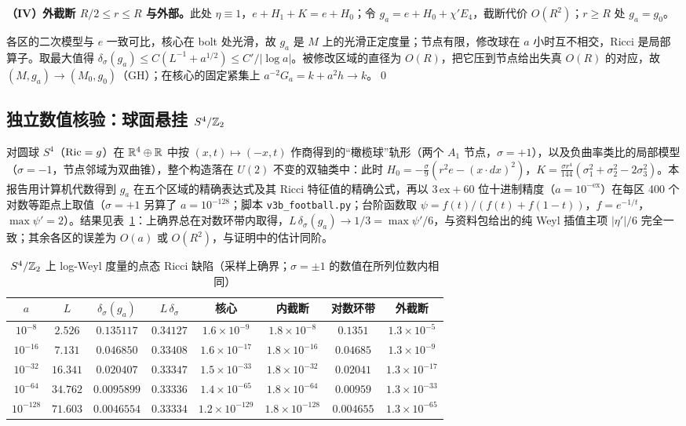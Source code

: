 \textbf{（IV）外截断 $R/2\le r\le R$ 与外部。}此处 $\eta\equiv1$，$e+H_1+K=e+H_0$；令 $g_a=e+H_0+\chi'E_4$，截断代价 $O(R^2)$；$r\ge R$ 处 $g_a=g_0$。

各区的二次模型与 $e$ 一致可比，核心在 bolt 处光滑，故 $g_a$ 是 $M$ 上的光滑正定度量；节点有限，修改球在 $a$ 小时互不相交，Ricci 是局部算子。取最大值得 $\delta_\sigma(g_a)\le C(L^{-1}+a^{1/2})\le C'/|\log a|$。被修改区域的直径为 $O(R)$，把它压到节点给出失真 $O(R)$ 的对应，故 $(M,g_a)\to(M_0,g_0)$（GH）；在核心的固定紧集上 $a^{-2}G_a=k+a^2h\to k$。\qed

\subsection{独立数值核验：球面悬挂 $S^4/\mathbb Z_2$}\label{sec:football}
对圆球 $S^4$（$\operatorname{Ric}=g$）在 $\mathbb R^4\oplus\mathbb R$ 中按 $(x,t)\mapsto(-x,t)$ 作商得到的“橄榄球”轨形（两个 $A_1$ 节点，$\sigma=+1$），以及负曲率类比的局部模型（$\sigma=-1$，节点邻域为双曲锥），整个构造落在 $U(2)$ 不变的双轴类中：此时 $H_0=-\frac{\sigma}{9}(r^2e-(x\cdot dx)^2)$，$K=\frac{\sigma r^4}{144}(\sigma_1^2+\sigma_2^2-2\sigma_3^2)$。本报告用计算机代数得到 $g_a$ 在五个区域的精确表达式及其 Ricci 特征值的精确公式，再以 $3\,\mathrm{ex}+60$ 位十进制精度（$a=10^{-\mathrm{ex}}$）在每区 400 个对数等距点上取值（$\sigma=+1$ 另算了 $a=10^{-128}$；脚本 \texttt{v3b\_football.py}；台阶函数取 $\psi=f(t)/(f(t)+f(1-t))$，$f=e^{-1/t}$，$\max\psi'=2$）。结果见表~\ref{tab:football}：上确界总在对数环带内取得，$L\,\delta_\sigma(g_a)\to1/3=\max\psi'/6$，与资料包给出的纯 Weyl 插值主项 $|\eta'|/6$ 完全一致；其余各区的误差为 $O(a)$ 或 $O(R^2)$，与证明中的估计同阶。

\begin{table}[ht]\centering\small
\caption{$S^4/\mathbb Z_2$ 上 log-Weyl 度量的点态 Ricci 缺陷（采样上确界；$\sigma=\pm1$ 的数值在所列位数内相同）}\label{tab:football}
\begin{tabular}{cccccccc}
\toprule
$a$ & $L$ & $\delta_\sigma(g_a)$ & $L\,\delta_\sigma$ & 核心 & 内截断 & 对数环带 & 外截断\\\midrule
$10^{-8}$ & $2.526$ & $0.135117$ & $0.34127$ & $1.6\times10^{-9}$ & $1.8\times10^{-8}$ & $0.1351$ & $1.3\times10^{-5}$\\
$10^{-16}$ & $7.131$ & $0.046850$ & $0.33408$ & $1.6\times10^{-17}$ & $1.8\times10^{-16}$ & $0.04685$ & $1.3\times10^{-9}$\\
$10^{-32}$ & $16.341$ & $0.020407$ & $0.33347$ & $1.5\times10^{-33}$ & $1.8\times10^{-32}$ & $0.02041$ & $1.3\times10^{-17}$\\
$10^{-64}$ & $34.762$ & $0.0095899$ & $0.33336$ & $1.4\times10^{-65}$ & $1.8\times10^{-64}$ & $0.00959$ & $1.3\times10^{-33}$\\
$10^{-128}$ & $71.603$ & $0.0046554$ & $0.33334$ & $1.2\times10^{-129}$ & $1.8\times10^{-128}$ & $0.004655$ & $1.3\times10^{-65}$\\
\bottomrule
\end{tabular}
\end{table}

